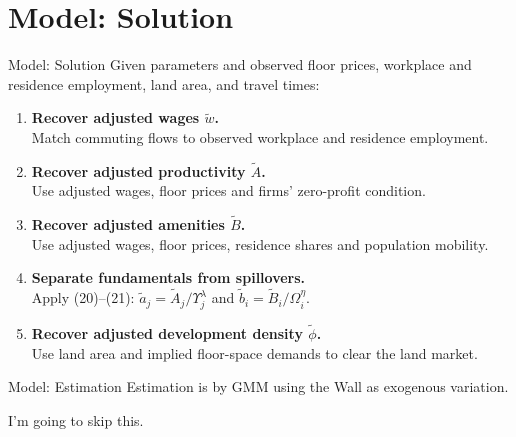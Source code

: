 \documentclass[aspectratio=169,11pt]{beamer}
\begin{document}
\section{Model: Solution}
\begin{frame}{Model: Solution}
  \small
  Given parameters and observed floor prices, workplace and residence
  employment, land area, and travel times:
  \vspace{0.5em}
  \begin{enumerate}
    \setlength{\itemsep}{0.7em}
    \item<1-> \textbf{Recover adjusted wages $\widetilde w$.}\\
      Match commuting flows to observed workplace and residence employment.
    \item<2-> \textbf{Recover adjusted productivity $\widetilde A$.}\\
      Use adjusted wages, floor prices and firms' zero-profit condition.
    \item<3-> \textbf{Recover adjusted amenities $\widetilde B$.}\\
      Use adjusted wages, floor prices, residence shares and population mobility.
    \item<4-> \textbf{Separate fundamentals from spillovers.}\\
      Apply (20)--(21):
      $\widetilde a_j=\widetilde A_j/\Upsilon_j^\lambda$ and
      $\widetilde b_i=\widetilde B_i/\Omega_i^\eta$.
    \item<5-> \textbf{Recover adjusted development density $\widetilde\phi$.}\\
      Use land area and implied floor-space demands to clear the land market.
  \end{enumerate}
  \vspace{0.5em}
\end{frame}


\begin{frame}{Model: Estimation}
  \large
  Estimation is by GMM using the Wall as exogenous variation.
  \vspace{1.5em}

  I'm going to skip this.
\end{frame}
\end{document}
